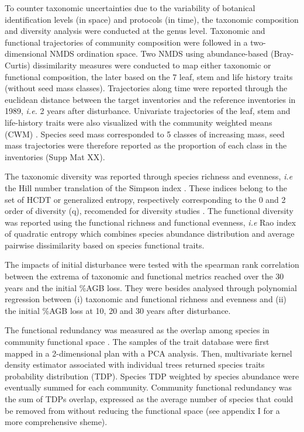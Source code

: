 \documentclass[fleqn,10pt]{ArtEcoFoG} %
\begin{document}
To counter taxonomic uncertainties due to the variability of botanical
identification levels (in space) and protocols (in time), the taxonomic
composition and diversity analysis were conducted at the genus level.
Taxonomic and functional trajectories of community composition were
followed in a two-dimensional NMDS ordination space. Two NMDS using
abundance-based (Bray-Curtis) dissimilarity measures were conducted to
map either taxonomic or functional composition, the later based on the 7
leaf, stem and life history traits (without seed mass classes).
Trajectories along time were reported through the euclidean distance
between the target inventories and the reference inventories in 1989,
\emph{i.e.} 2 years after disturbance. Univariate trajectories of the
leaf, stem and life-history traits were also visualized with the
community weighted means (CWM) \citep{Diaz2007, Garnier2004}. Species
seed mass corresponded to 5 classes of increasing mass, seed mass
trajectories were therefore reported as the proportion of each class in
the inventories (Supp Mat XX).

The taxonomic diversity was reported through species richness and
evenness, \emph{i.e} the Hill number translation of the Simpson index
\citep{Hill1973}. These indices belong to the set of HCDT or generalized
entropy, respectively corresponding to the 0 and 2 order of diversity
(q), recomended for diversity studies
\citep{Patil1982, Tothmeresz1995, Marcon2015b}. The functional diversity
was reported using the functional richness and functional evenness,
\emph{i.e} Rao index of quadratic entropy which combines species
abundance distribution and average pairwise dissimilarity based on
species functional traits.

The impacts of initial disturbance were tested with the spearman rank
correlation between the extrema of taxonomic and functional metrics
reached over the 30 years and the initial \%AGB loss. They were besides
analysed through polynomial regression between (i) taxonomic and
functional richness and evenness and (ii) the initial \%AGB loss at 10,
20 and 30 years after disturbance.

The functional redundancy was measured as the overlap among species in
community functional space \citep{Carmona2016}. The samples of the trait
database were first mapped in a 2-dimensional plan with a PCA analysis.
Then, multivariate kernel density estimator associated with individual
trees returned species traits probability distribution (TDP). Species
TDP weighted by species abundance were eventually summed for each
community. Community functional redundancy was the sum of TDPs overlap,
expressed as the average number of species that could be removed from
without reducing the functional space (see appendix I for a more
comprehensive sheme).
\end{document}
